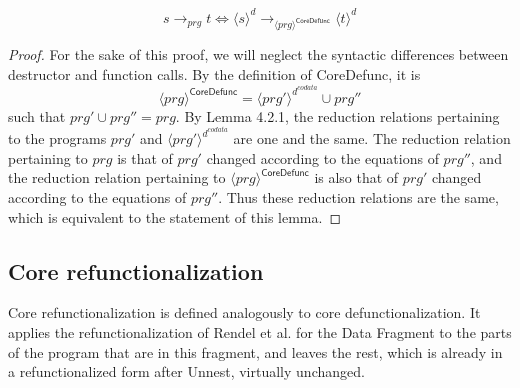 \begin{lemma}
\[
s \longrightarrow_{prg} t \iff \langle s \rangle^d \longrightarrow_{\langle prg \rangle^{\textsf{CoreDefunc}}} \langle t \rangle^d
\]

\begin{proof}
For the sake of this proof, we will neglect the syntactic differences between destructor and function calls. By the definition of \textsf{CoreDefunc}, it is
\[
\langle prg \rangle^{\textsf{CoreDefunc}} = \langle prg' \rangle^{d^{codata}} \cup prg''
\]
such that $prg' \cup prg'' = prg$. By Lemma 4.2.1, the reduction relations pertaining to the programs $prg'$ and $\langle prg' \rangle^{d^{codata}}$ are one and the same. The reduction relation pertaining to $prg$ is that of $prg'$ changed according to the equations of $prg''$, and the reduction relation pertaining to $\langle prg \rangle^{\textsf{CoreDefunc}}$ is also that of $prg'$ changed according to the equations of $prg''$. Thus these reduction relations are the same, which is equivalent to the statement of this lemma.
\end{proof}
\end{lemma}

\subsection{Core refunctionalization}

Core refunctionalization is defined analogously to core defunctionalization. It applies the refunctionalization of Rendel et al. for the Data Fragment to the parts of the program that are in this fragment, and leaves the rest, which is already in a refunctionalized form after \textsf{Unnest}, virtually unchanged. 

